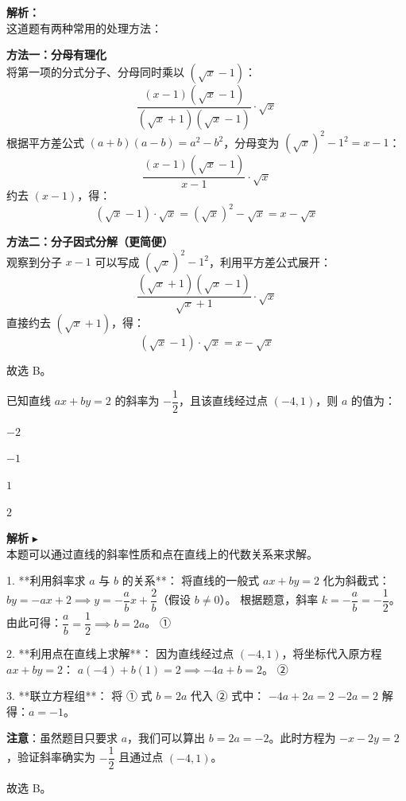 \begin{solution}
    \textbf{解析：} \\
    这道题有两种常用的处理方法：
    
    \textbf{方法一：分母有理化} \\
    将第一项的分式分子、分母同时乘以 $(\sqrt{x}-1)$：
    $$\frac{(x-1)(\sqrt{x}-1)}{(\sqrt{x}+1)(\sqrt{x}-1)} \cdot \sqrt{x}$$
    根据平方差公式 $(a+b)(a-b)=a^2-b^2$，分母变为 $(\sqrt{x})^2 - 1^2 = x-1$：
    $$\frac{(x-1)(\sqrt{x}-1)}{x-1} \cdot \sqrt{x}$$
    约去 $(x-1)$，得：
    $$(\sqrt{x}-1) \cdot \sqrt{x} = (\sqrt{x})^2 - \sqrt{x} = x - \sqrt{x}$$

    \textbf{方法二：分子因式分解（更简便）} \\
    观察到分子 $x-1$ 可以写成 $(\sqrt{x})^2 - 1^2$，利用平方差公式展开：
    $$\frac{(\sqrt{x}+1)(\sqrt{x}-1)}{\sqrt{x}+1} \cdot \sqrt{x}$$
    直接约去 $(\sqrt{x}+1)$，得：
    $$(\sqrt{x}-1) \cdot \sqrt{x} = x - \sqrt{x}$$
    
    故选 B。
\end{solution}

\begin{question}
    已知直线 $ax + by = 2$ 的斜率为 $-\dfrac{1}{2}$，且该直线经过点 $(-4, 1)$，则 $a$ 的值为： \paren[C]
    \begin{choices}
        \item $-2$ \item $-1$ \item $1$ \item $2$
    \end{choices}
\end{question}

\begin{solution}
    \textbf{解析} $\blacktriangleright$ \\
    本题可以通过直线的斜率性质和点在直线上的代数关系来求解。

    1. **利用斜率求 $a$ 与 $b$ 的关系**：
    将直线的一般式 $ax + by = 2$ 化为斜截式：
    $by = -ax + 2 \implies y = -\dfrac{a}{b}x + \dfrac{2}{b}$（假设 $b \neq 0$）。
    根据题意，斜率 $k = -\dfrac{a}{b} = -\dfrac{1}{2}$。
    由此可得：$\dfrac{a}{b} = \dfrac{1}{2} \implies b = 2a$。 \hfill ①

    2. **利用点在直线上求解**：
    因为直线经过点 $(-4, 1)$，将坐标代入原方程 $ax + by = 2$：
    $a(-4) + b(1) = 2 \implies -4a + b = 2$。 \hfill ②

    3. **联立方程组**：
    将 ① 式 $b = 2a$ 代入 ② 式中：
    $-4a + 2a = 2$
    $-2a = 2$
    解得：$a = -1$。

    \textbf{注意}：虽然题目只要求 $a$，我们可以算出 $b = 2a = -2$。此时方程为 $-x - 2y = 2$，验证斜率确实为 $-\dfrac{1}{2}$ 且通过点 $(-4, 1)$。

    故选 B。
\end{solution}

